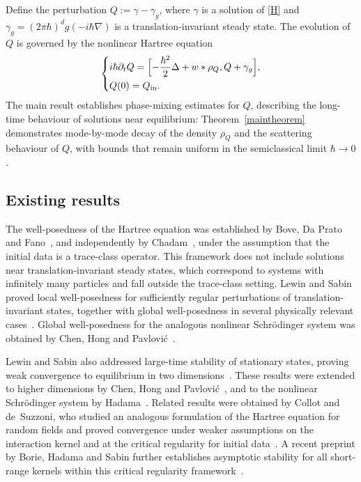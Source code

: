 \documentclass[JEP,XML,SOM,Unicode]{cedram}
\newenvironment{mycases}
{\begin{dcases*}}
{\end{dcases*}}
\theoremstyle{plain}
\theoremstyle{remark}
\newcommand{\sBbr}[1]{\Bigl[#1\Bigr]}
\newcommand{\p}{\partial}
\begin{document}
Define the perturbation \(Q := \gamma - \gamma_g\), where \(\gamma\) is a solution of \eqref{H} and $\gamma_g=(2\pi\hbar)^dg(-i\hbar\nabla)$ is a translation-invariant steady state. The evolution of \(Q\) is governed by the nonlinear Hartree equation
\begin{align}\label{NH}
\begin{mycases}
i\hbar\p_t Q = \sBbr{-\frac{\hbar^2}{2}\Delta + w*\rho_{Q}, Q + \gamma_g}, \\
Q(0) = Q_{\mathrm{in}}.
\end{mycases}
\end{align}
The main result establishes phase-mixing estimates for \(Q\), describing the long-time behaviour of solutions near equilibrium: Theorem~\ref{maintheorem} demonstrates mode-by-mode decay of the density \(\rho_Q\) and the scattering behaviour of \(Q\), with bounds that remain uniform in the semiclassical limit $\hbar\to0$.

\subsection{Existing results}
The well-posedness of the Hartree equation was established by Bove, Da Prato and Fano~\cite{BoveDaPratoFano1974,BoveDaPratoFano1976}, and independently by Chadam~\cite{Chadam1976}, under the assumption that the initial data is a trace-class operator. This framework does not include solutions near translation-invariant steady states, which correspond to systems with infinitely many particles and fall outside the trace-class setting. Lewin and Sabin proved local well-posedness for sufficiently regular perturbations of translation-invariant states, together with global well-posedness in several physically relevant cases~\cite{LewinSabinI2015}. Global well-posedness for the analogous nonlinear Schrödinger system was obtained by Chen, Hong and Pavlović~\cite{ChenHongPavlovic2017}.

Lewin and Sabin also addressed large-time stability of stationary states, proving weak convergence to equilibrium in two dimensions~\cite{LewinSabinII2014}. These results were extended to higher dimensions by Chen, Hong and Pavlović~\cite{ChenHongPavlovic2018}, and to the nonlinear Schrödinger system by Hadama~\cite{hadama2024asymptoticstabilitywideclass}. Related results were obtained by Collot and de~Suzzoni, who studied an analogous formulation of the Hartree equation for random fields and proved convergence under weaker assumptions on the interaction kernel and at the critical regularity for initial data~\cite{CollotdeSuzzoni2020,CollotdeSuzzoni2022}. A recent preprint by Borie, Hadama and Sabin further establishes asymptotic stability for all short-range kernels within this critical regularity framework~\cite{BorieHadamaSabin2025}.
\end{document}
